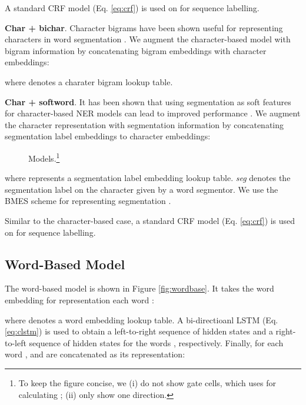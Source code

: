 \documentclass[11pt,a4paper]{article}
\begin{document}
\begin{CJK*}{UTF8}{gbsn}
A standard CRF model (Eq. \ref{eq:crf}) is used on  for sequence labelling. 



\noindent \textbullet \; \textbf{Char + bichar}. Character bigrams have been shown useful for representing characters in word segmentation \cite{chen-EtAl:2015:EMNLP2,yang-zhang-dong:2017:Long}. We augment the character-based model with bigram information by concatenating bigram embeddings with character embeddings:

where  denotes a charater bigram lookup table.

\noindent \textbullet \; \textbf{Char + softword}. It has been shown that using segmentation as soft features for character-based NER models can lead to improved performance \cite{zhao2008unsupervised,peng2016improving}. We augment the character representation with segmentation information by concatenating segmentation label embeddings to character embeddings:


\begin{figure}[!t]
  \centering 
  \caption{Models.\footnote{To keep the figure concise, we (i) do not show gate cells, which uses  for calculating ; (ii) only show one direction.}} 
  \label{fig:models} \end{figure}

where  represents a segmentation label embedding lookup table. \textit{seg} denotes the segmentation label on the character  given by a word segmentor. We use the BMES scheme for representing segmentation \cite{xue2003Chinese}.




Similar to the character-based case, a standard CRF model (Eq. \ref{eq:crf}) is used on  for sequence labelling. 


\subsection{Word-Based Model}\label{sec:word-based}
The word-based model is shown in Figure \ref{fig:wordbase}. It takes the word embedding  for representation each word :

where  denotes a word embedding lookup table.
A bi-directioanl LSTM (Eq. \ref{eq:clstm}) is used to obtain a left-to-right sequence of hidden states  and a right-to-left sequence of hidden states  for the words , respectively. Finally, for each word ,  and  are concatenated as its representation:





\end{CJK*}
\end{document}
